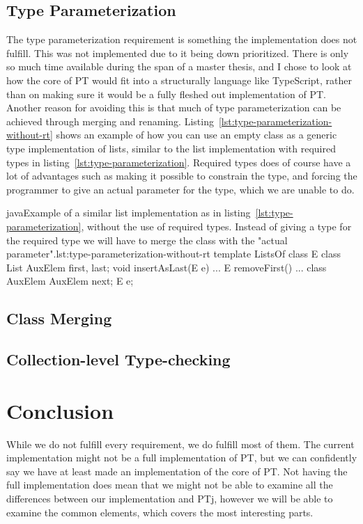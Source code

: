 \subsection{Type Parameterization}\label{subsec:pts-type-parameterization}

The type parameterization requirement is something the implementation does not fulfill.
This was not implemented due to it being down prioritized.
There is only so much time available during the span of a master thesis, and I chose to look at how the core of PT would fit into a structurally language like TypeScript, rather than on making sure it would be a fully fleshed out implementation of PT\@.
Another reason for avoiding this is that much of type parameterization can be achieved through merging and renaming.
Listing~\vref{lst:type-parameterization-without-rt} shows an example of how you can use an empty class as a generic type implementation of lists, similar to the list implementation with required types in listing~\vref{lst:type-parameterization}.
Required types does of course have a lot of advantages such as making it possible to constrain the type, and forcing the programmer to give an actual parameter for the type, which we are unable to do.

\begin{code}{java}{Example of a similar list implementation as in listing~\vref{lst:type-parameterization}, without the use of required types. Instead of giving a type for the required type we will have to merge the class  with the "actual parameter".}{lst:type-parameterization-without-rt}
    template ListsOf {
        class E { }
        class List {
            AuxElem first, last;
            void insertAsLast(E e) { ... }
            E removeFirst() { ... }
        }
        class AuxElem {
            AuxElem next;
            E e;
        }
    }
\end{code}

\subsection{Class Merging}

\subsection{Collection-level Type-checking}\label{subsec:implementation-collection-level-type-checking}

\section{Conclusion}\label{sec:requirements-conclusion}

While we do not fulfill every requirement, we do fulfill most of them.
The current implementation might not be a full implementation of PT, but we can confidently say we have at least made an implementation of the core of PT.
Not having the full implementation does mean that we might not be able to examine all the differences between our implementation and PTj, however we will be able to examine the common elements, which covers the most interesting parts.